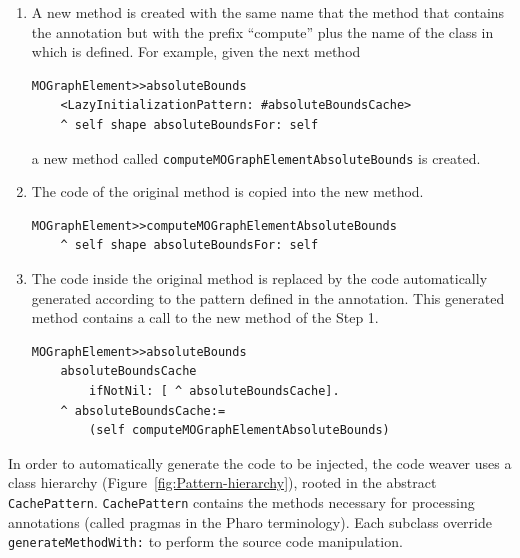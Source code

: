 \documentclass[preprint,10pt]{sigplanconf}
\newcommand{\ct}{\lstinline[backgroundcolor=\color{white},basicstyle=\footnotesize\ttfamily]}
\newcommand{\figref}[1]{Figure~\ref{fig:#1}\xspace}
\begin{document}
\begin{enumerate}
\item A new method is created with the same name that the method that contains
the annotation but with the prefix {}``compute'' plus the name of the
class in which is defined. For example, given the next method
\begin{lstlisting} 
MOGraphElement>>absoluteBounds
	<LazyInitializationPattern: #absoluteBoundsCache> 
	^ self shape absoluteBoundsFor: self
\end{lstlisting}
a new method called \ct{computeMOGraphElementAbsoluteBounds} is created.
\item The code of the original method is copied into the new method.
\begin{lstlisting} 
MOGraphElement>>computeMOGraphElementAbsoluteBounds
	^ self shape absoluteBoundsFor: self
\end{lstlisting}
\item The code inside the original method is replaced by the code automatically
generated according to the pattern defined in the annotation. This generated
method contains a call to the new method of the Step 1.
\begin{lstlisting} 
MOGraphElement>>absoluteBounds
	absoluteBoundsCache 
		ifNotNil: [ ^ absoluteBoundsCache].
	^ absoluteBoundsCache:=
		(self computeMOGraphElementAbsoluteBounds)
\end{lstlisting}
\end{enumerate}

In order to automatically generate the code to be injected, the code weaver uses a class hierarchy (\figref{Pattern-hierarchy}), rooted in the abstract \ct{CachePattern}.
\ct{CachePattern} contains the methods necessary for processing annotations (called pragmas in the Pharo terminology). Each subclass override \ct{generateMethodWith:} to perform the source code manipulation.
\end{document}
